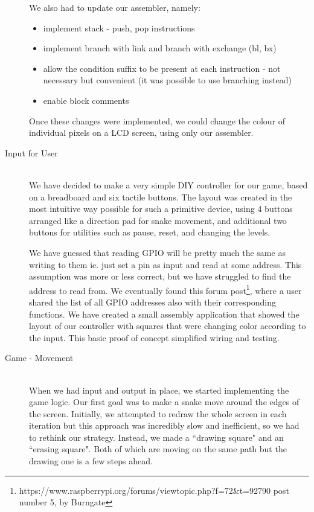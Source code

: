 \documentclass[9pt]{article}
\begin{document}
\begin{description}
    We also had to update our assembler, namely:
    \begin{itemize}
    \item implement stack - push, pop instructions
    \item implement branch with link and branch with exchange (bl, bx)
    \item allow the condition suffix to be present at each instruction - not necessary but convenient (it was possible to use branching instead)
    \item enable block comments
    \end{itemize}
    
    Once these changes were implemented, we could change the colour of individual pixels on a LCD screen, using only our assembler.
    
    
    \item[Input for User] \hfill \\
    We have decided to make a very simple DIY controller for our game, based on a breadboard and six tactile buttons. The layout was created in the most intuitive way possible for such a primitive device, using 4 buttons arranged like a direction pad for snake movement, and additional two buttons for utilities such as pause, reset, and changing the levels. 
    
    We have guessed that reading GPIO will be pretty much the same as writing to them ie. just set a pin as input and read at some address. This assumption was more or less correct, but we have struggled to find the address to read from. We eventually found this forum post\footnote{https://www.raspberrypi.org/forums/viewtopic.php?f=72\&t=92790 post number 5, by Burngate}, where a user shared the list of all GPIO addresses also with their corresponding functions. We have created a small assembly application that showed the layout of our controller with squares that were changing color according to the input. This basic proof of concept simplified wiring and testing.
    
    \item[Game - Movement] \hfill \\
        When we had input and output in place, we started implementing the game logic. Our first goal was to make a snake move around the edges of the screen. Initially, we attempted to redraw the whole screen in each iteration but this approach was incredibly slow and inefficient, so we had to rethink our strategy. Instead, we made a ``drawing square" and an ``erasing  square". Both of which are moving on the same path but the drawing one is a few steps ahead.
        

\end{description}
\end{document}
